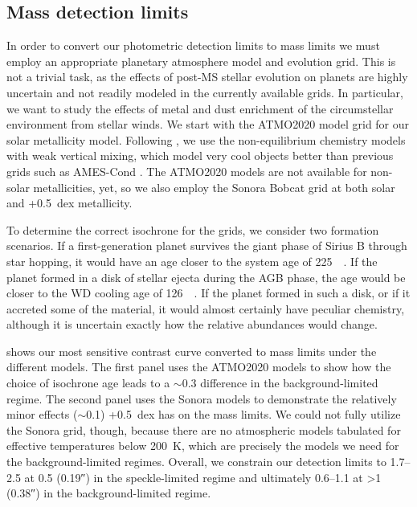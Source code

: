 \documentclass[twocolumn]{aastex631}
\begin{document}
\subsection{Mass detection limits}

In order to convert our photometric detection limits to mass limits we must employ an appropriate planetary atmosphere model and evolution grid. This is not a trivial task, as the effects of post-MS stellar evolution on planets are highly uncertain and not readily modeled in the currently available grids. In particular, we want to study the effects of metal and dust enrichment of the circumstellar environment from stellar winds. We start with the ATMO2020 model grid \citep{phillipsNewSetAtmosphere2020a} for our solar metallicity model. Following \citet{pathakHighContrastImaging2021}, we use the non-equilibrium chemistry models with weak vertical mixing, which model very cool objects better than previous grids such as AMES-Cond \citep{allardModelsVerylowmassStars2012}. The ATMO2020 models are not available for non-solar metallicities, yet, so we also employ the Sonora Bobcat grid \citep{marleySonoraBobcatCloudfree2021,marleySonoraBrownDwarf2021} at both solar and +\qty{0.5}{dex} metallicity.

To determine the correct isochrone for the grids, we consider two formation scenarios. If a first-generation planet survives the giant phase of Sirius B through star hopping, it would have an age closer to the system age of \qty{225}{\mega\year}. If the planet formed in a disk of stellar ejecta during the AGB phase, the age would be closer to the WD cooling age of \qty{126}{\mega\year}. If the planet formed in such a disk, or if it accreted some of the material, it would almost certainly have peculiar chemistry, although it is uncertain exactly how the relative abundances would change. 

 shows our most sensitive contrast curve converted to mass limits under the different models. The first panel uses the ATMO2020 models to show how the choice of isochrone age leads to a $\sim$\qty{0.3}{\jupitermass} difference in the background-limited regime. The second panel uses the Sonora models to demonstrate the relatively minor effects ($\sim$\qty{0.1}{\jupitermass}) +\qty{0.5}{dex} has on the mass limits. We could not fully utilize the Sonora grid, though, because there are no atmospheric models tabulated for effective temperatures below \qty{200}{\kelvin}, which are precisely the models we need for the background-limited regimes. Overall, we constrain our detection limits to \qtyrange{1.7}{2.5}{\jupitermass} at \qty{0.5}{\au} (\ang{;;0.19}) in the speckle-limited regime and ultimately \qtyrange{0.6}{1.1}{\jupitermass} at \textgreater\qty{1}{\au} (\ang{;;0.38}) in the background-limited regime.
\end{document}
